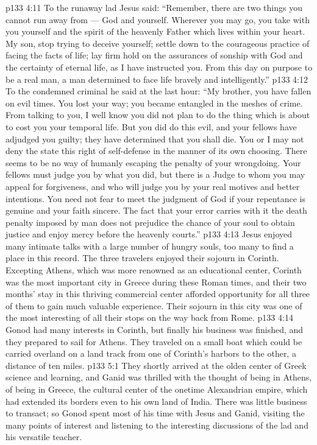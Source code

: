 \vs p133 4:11 \pc To the runaway lad Jesus said: \textcolor{ubdarkred}{“Remember, there are two things you cannot run away from --- God and yourself. Wherever you may go, you take with you yourself and the spirit of the heavenly Father which lives within your heart. My son, stop trying to deceive yourself; settle down to the courageous practice of facing the facts of life; lay firm hold on the assurances of sonship with God and the certainty of eternal life, as I have instructed you. From this day on purpose to be a real man, a man determined to face life bravely and intelligently.”}
\vs p133 4:12 \pc To the condemned criminal he said at the last hour: \textcolor{ubdarkred}{“My brother, you have fallen on evil times. You lost your way; you became entangled in the meshes of crime. From talking to you, I well know you did not plan to do the thing which is about to cost you your temporal life. But you did do this evil, and your fellows have adjudged you guilty; they have determined that you shall die. You or I may not deny the state this right of self\hyp{}defense in the manner of its own choosing. There seems to be no way of humanly escaping the penalty of your wrongdoing. Your fellows must judge you by what you did, but there is a Judge to whom you may appeal for forgiveness, and who will judge you by your real motives and better intentions. You need not fear to meet the judgment of God if your repentance is genuine and your faith sincere. The fact that your error carries with it the death penalty imposed by man does not prejudice the chance of your soul to obtain justice and enjoy mercy before the heavenly courts.”}
\vs p133 4:13 \pc Jesus enjoyed many intimate talks with a large number of hungry souls, too many to find a place in this record. The three travelers enjoyed their sojourn in Corinth. Excepting Athens, which was more renowned as an educational center, Corinth was the most important city in Greece during these Roman times, and their two months’ stay in this thriving commercial center afforded opportunity for all three of them to gain much valuable experience. Their sojourn in this city was one of the most interesting of all their stops on the way back from Rome.
\vs p133 4:14 Gonod had many interests in Corinth, but finally his business was finished, and they prepared to sail for Athens. They traveled on a small boat which could be carried overland on a land track from one of Corinth’s harbors to the other, a distance of ten miles.
\vs p133 5:1 They shortly arrived at the olden center of Greek science and learning, and Ganid was thrilled with the thought of being in Athens, of being in Greece, the cultural center of the onetime Alexandrian empire, which had extended its borders even to his own land of India. There was little business to transact; so Gonod spent most of his time with Jesus and Ganid, visiting the many points of interest and listening to the interesting discussions of the lad and his versatile teacher.

